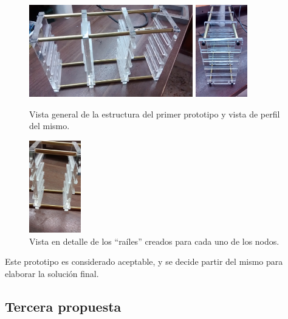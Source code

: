 \begin{figure}[H]
\centering
\includegraphics[width=0.635\textwidth]{Chapter5/Figures/prototipo1vistageneral}
\includegraphics[width=0.2\textwidth]{Chapter5/Figures/prototipo1vistaperfil}
\caption[Vista general del primer prototipo]{Vista general de la estructura del primer prototipo y vista de perfil del mismo.}
\end{figure}

\begin{figure}[H]
\centering
\includegraphics[width=0.2\textwidth]{Chapter5/Figures/prototipo1vistadetalle}
\caption[Vista en detalle de los ``raíles'' del primer prototipo.]{Vista en detalle de los ``raíles'' creados para cada uno de los nodos.}
\end{figure}

Este prototipo es considerado aceptable, y se decide partir del mismo para elaborar la solución final.

\subsection{Tercera propuesta}

